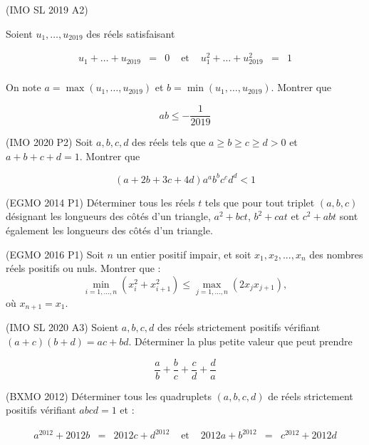 \begin{exo}
(IMO SL 2019 A2)

Soient $u_1, \ldots , u_{2019}$ des réels satisfaisant 

\[\begin{array}{lllllll}
u_1 + \ldots + u_{2019} &=& 0 & \text{ et } & u_1^2+ \ldots + u_{2019}^2 &=& 1 \\
\end{array}\]

On note $a= \max (u_1, \ldots , u_{2019})$ et $b= \min (u_1, \ldots , u_{2019})$. Montrer que 

\[ab \leqslant - \frac1{2019}\]
\end{exo}

\begin{exo}
(IMO 2020 P2) 
Soit $a,b,c,d$ des réels tels que $a\geqslant b \geqslant c\geqslant d >0$ et $a+b+c+d=1$. Montrer que 

\[(a+2b+3c+4d)a^ab^bc^cd^d<1\] 

\end{exo}

\begin{exo}
(EGMO 2014 P1)
Déterminer tous les réels $t$ tels que pour tout triplet $(a,b,c)$ désignant les longueurs des côtés d'un triangle, $a^2+bct$, $b^2+cat$ et $c^2+abt$ sont également les longueurs des côtés d'un triangle.
\end{exo}

\begin{exo}
(EGMO 2016 P1)
Soit $n$ un entier positif impair, et soit $x_1,x_2,...,x_n$ des nombres réels positifs ou nuls. Montrer que :
\[
\min_{i=1,...,n}(x_i^2+x_{i+1}^2) \leq \max_{j=1,...,n}(2x_jx_{j+1}),
\]
où $x_{n+1}=x_1$.
\end{exo}


\begin{exo}
(IMO SL 2020 A3)
Soient $a,b,c,d$ des réels strictement positifs vérifiant $(a+c)(b+d)=ac+bd$. Déterminer la plus petite valeur que peut prendre 

\[\frac{a}{b}+\frac{b}{c}+\frac{c}{d}+\frac{d}{a}\]
\end{exo}

\begin{exo}
(BXMO 2012)
Déterminer tous les quadruplets $(a,b,c,d)$ de réels strictement positifs vérifiant $abcd=1$ et :

\[\begin{array}{lllllll}
a^{2012}+2012b &=& 2012c+d^{2012} &\text{ et } & 2012a+b^{2012} &=& c^{2012}+2012d\\
\end{array}\]
\end{exo}


